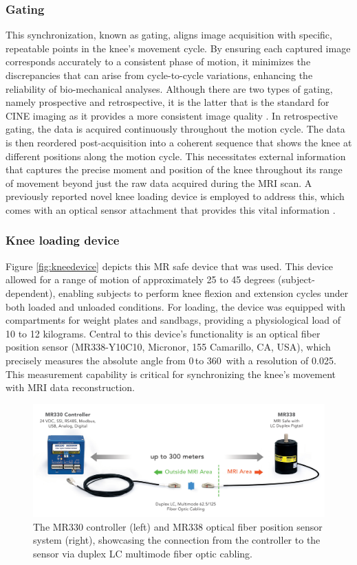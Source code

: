 \documentclass{micro-econ-thesis}
\begin{document}
\subsubsection{Gating} 

This synchronization, known as gating, aligns image acquisition with specific, repeatable points in the knee's movement cycle. By ensuring each captured image corresponds accurately to a consistent phase of motion, it minimizes the discrepancies that can arise from cycle-to-cycle variations, enhancing the reliability of bio-mechanical analyses. Although there are two types of gating, namely prospective and retrospective, it is the latter that is the standard for CINE imaging as it provides a more consistent image quality \parencite[p. 102]{edelman_clinical_1996}. In retrospective gating, the data is acquired continuously throughout the motion cycle. The data is then reordered post-acquisition into a coherent sequence that shows the knee at different positions along the motion cycle. This necessitates external information that captures the precise moment and position of the knee throughout its range of movement beyond just the raw data acquired during the MRI scan. A previously reported novel knee loading device is employed to address this, which comes with an optical sensor attachment that provides this vital information \parencite{brisson_novel_2022}. 

\subsubsection{Knee loading device }

Figure \ref{fig:kneedevice} depicts this MR safe device that was used. This device allowed for a range of motion of approximately 25 to 45 degrees (subject-dependent), enabling subjects to perform knee flexion and extension cycles under both loaded and unloaded conditions. For loading, the device was equipped with compartments for weight plates and sandbags, providing a physiological load of 10 to 12 kilograms. Central to this device's functionality is an optical fiber position sensor (MR338-Y10C10, Micronor, 155 Camarillo, CA, USA), which precisely  measures the ab­solute angle from 0{\degree}\,to 360\degree \, with a resolution of 0.025\degree \parencite{rickenbach_optical_2013}. This measurement capability is critical for synchronizing the knee's movement with MRI data reconstruction. 
\begin{figure} [H]
	\centering
	\includegraphics[width=0.7\linewidth]{sensor_img}
	\caption{The MR330 controller (left) and MR338 optical fiber position sensor system (right), showcasing the connection from the controller to the sensor via duplex LC multimode fiber optic cabling.}
	\label{fig:sensorimg}
\end{figure}
\end{document}
